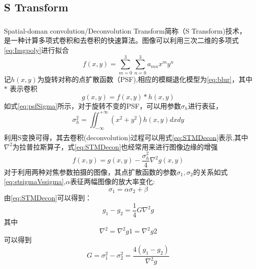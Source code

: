 \documentclass[UTF8]{ctexart}
\newcommand{\myciteup}[1]{\textsuperscript{\textsuperscript{\cite{#1}}}}
\begin{document}
\begin{sloppypar}
        \subsection{S Transform}
        Spatial-doman convolution/Deconvolution Transform\myciteup{subbarao1991spatial}简称（S Transform)技术，是一种计算多项式卷积和去卷积的快速算法。图像可以利用三次二维的多项式\eqref{eq:Imgpoly}进行拟合
        \begin{equation}
            f(x,y) = \sum\limits_{m=0}^{3}\sum\limits_{n=0}^{3}a_{mn}x^my^n
            \label{eq:Imgpoly}
        \end{equation}
        记$h(x,y)$为旋转对称的点扩散函数（PSF),相应的模糊退化模型为\eqref{eq:blur}，其中$\ast$ 表示卷积
        \begin{equation}
            g(x,y) = f(x,y)\ast h(x,y)
            \label{eq:blur}
        \end{equation}
        如式\eqref{eq:psfSigma}所示，对于旋转不变的PSF，可以用参数$\sigma_h$进行表征，
        \begin{equation}
            \sigma_h^2 = \iint_{-\infty}^{+\infty}(x^2+y^2)h(x,y)dxdy
            \label{eq:psfSigma}
        \end{equation}
        利用S变换\myciteup{subbarao1991spatial}可得，其去卷积(deconvolution)过程可以用式\eqref{eq:STMDecon}表示,其中$\nabla^2$为拉普拉斯算子，式\eqref{eq:STMDecon}也经常用来进行图像边缘的增强
        \begin{equation}
            f(x,y) = g(x,y) - \frac{\sigma_h^2}{4}\nabla^{2}g(x,y)
            \label{eq:STMDecon}
        \end{equation}
        对于利用两种对焦参数拍摄的图像，其点扩散函数的参数$\sigma_1,\sigma_2$的关系如式\eqref{eq:stsigmaVssigma},$\alpha$表征两幅图像的放大率变化:
        \begin{equation}
            \sigma_1 = \alpha\sigma_2 + \beta
            \label{eq:stsigmaVssigma}
        \end{equation}
        由\eqref{eq:STMDecon}可以得到：
        \begin{equation}
            g_1 - g_2 = \frac{1}{4}G\nabla^{2}g
            \label{eq:st_g1_g2}
        \end{equation}
        其中
        \begin{equation}
            \nabla^{2} = \nabla^{2}g1=\nabla^2 g2
            \label{eq:stDg1EqDg2}
        \end{equation}
        可以得到
        \begin{equation}
            G=\sigma_1^2-\sigma_2^2 = \frac{4(g_1-g_2)}{\nabla^2 g}

\end{equation}
\end{sloppypar}
\end{document}

